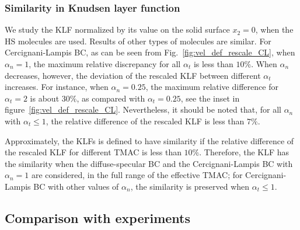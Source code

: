 \subsubsection{Similarity in Knudsen layer function}


We study the KLF normalized by its value on the solid surface $x_2=0$, when the HS molecules are used. Results of other types of molecules are similar. For Cercignani-Lampis BC, as can be seen from Fig.~\ref{fig:vel_def_rescale_CL}, when $\alpha_n=1$, the maximum relative discrepancy for all $\alpha_t$ is less than $10\%$. When $\alpha_n$ decreases, however, the deviation of the rescaled KLF between different $\alpha_t$ increases. For instance, when $\alpha_n=0.25$, the maximum relative difference for $\alpha_t=2$ is about $30\%$, as compared with $\alpha_t=0.25$, see the inset in figure~\ref{fig:vel_def_rescale_CL}. Nevertheless, it should be noted that, for all $\alpha_n$ with $\alpha_t\le 1 $, the relative difference of the rescaled KLF is less than $7\%$.


Approximately, the KLFs is defined to have similarity if the relative difference of the rescaled KLF for different TMAC is less than $10\%$. Therefore, the KLF has the similarity when the diffuse-specular BC and the Cercignani-Lampis BC with $\alpha_n=1$ are considered, in the full range of the effective TMAC; for Cercignani-Lampis BC with other values of $\alpha_n$, the similarity is preserved when $\alpha_t\leq1$. 







\subsection{Comparison with experiments}\label{sec:exp}

